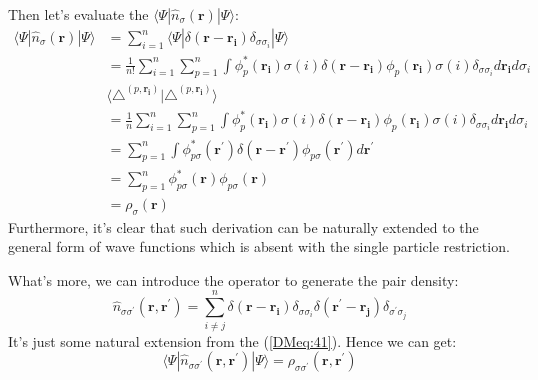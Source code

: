 Then let's evaluate the
$\langle\Psi|\hat{n}_{\sigma}(\bm{r})|\Psi\rangle$:
\begin{equation}\label{}
\begin{split}
\langle\Psi|\hat{n}_{\sigma}(\bm{r})|\Psi\rangle &=
\sum_{i=1}^{n}\langle\Psi|\delta(\bm{r} -
\bm{r_{i}})\delta_{\sigma\sigma_{i}}|\Psi\rangle \\
    &= \frac{1}{n!}\sum_{i=1}^{n}\sum_{p=1}^{n}\int
\phi^{*}_{p}(\bm{r_{i}})\sigma(i)\delta(\bm{r} -
\bm{r_{i}})\phi_{p}(\bm{r_{i}})\sigma(i)\delta_{\sigma\sigma_{i}}
d\bm{r_{i}}d\sigma_{i}\\
&\langle\triangle^{(p, \bm{r_{i}})}|\triangle^{(p,
\bm{r_{i}})}\rangle \\
&=\frac{1}{n}\sum_{i=1}^{n}\sum_{p=1}^{n}\int
\phi^{*}_{p}(\bm{r_{i}})\sigma(i)\delta(\bm{r} -
\bm{r_{i}})\phi_{p}(\bm{r_{i}})\sigma(i)\delta_{\sigma\sigma_{i}}
d\bm{r_{i}}d\sigma_{i} \\
&=\sum_{p=1}^{n}\int \phi^{*}_{p\sigma}(\bm{r^{'}})\delta(\bm{r} -
\bm{r^{'}})\phi_{p\sigma}(\bm{r^{'}})
d\bm{r^{'}} \\
&=\sum_{p=1}^{n}\phi^{*}_{p\sigma}(\bm{r})\phi_{p\sigma}(\bm{r})
\quad \\
&= \rho_{\sigma}(\bm{r})
\end{split}
\end{equation}
Furthermore, it's clear that such derivation can be naturally
extended to the general form of wave functions which is absent with
the single particle restriction.

What's more, we can introduce the operator to generate the pair
density:
\begin{equation}\label{DMeq:42}
\hat{n}_{\sigma\sigma^{'}}(\bm{r}, \bm{r^{'}}) = \sum_{i\neq
j}^{n}\delta(\bm{r} - \bm{r_{i}})\delta_{\sigma\sigma_{i}}
\delta(\bm{r^{'}} - \bm{r_{j}})\delta_{\sigma^{'}\sigma_{j}}
\end{equation}
It's just some natural extension from the (\ref{DMeq:41}). Hence we
can get:
\begin{equation}\label{}
\langle\Psi|\hat{n}_{\sigma\sigma^{'}}(\bm{r},
\bm{r^{'}})|\Psi\rangle = \rho_{\sigma\sigma^{'}}(\bm{r},
\bm{r^{'}})
\end{equation}

